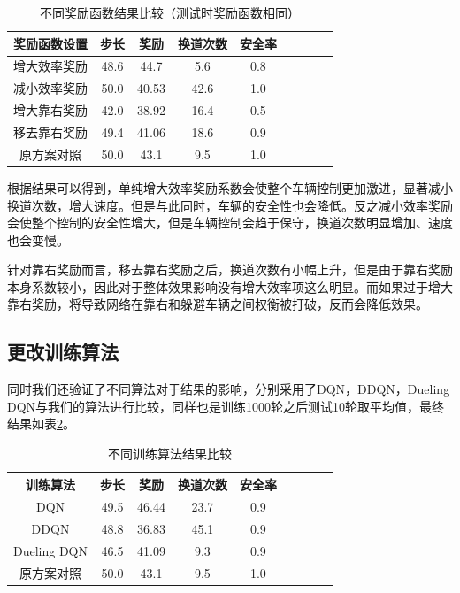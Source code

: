 \documentclass[letterpaper, 10 pt, conference]{ieeeconf}  %
\begin{document}
\begin{table}[!htbp] 
    \centering
    \caption{不同奖励函数结果比较（测试时奖励函数相同）}
    \begin{tabular}{ccccccccccc} %
    \toprule %
    \multicolumn{3}{c}{奖励函数设置}& 步长& 奖励&换道次数&安全率\\
    \hline %
    \multicolumn{3}{c}{增大效率奖励}& 48.6& 44.7& 5.6 &0.8& \\   %
    \multicolumn{3}{c}{减小效率奖励}& 50.0& 40.53& 42.6&1.0& \\
    \multicolumn{3}{c}{增大靠右奖励}& 42.0& 38.92& 16.4 & 0.5& \\
    \multicolumn{3}{c}{移去靠右奖励}& 49.4& 41.06& 18.6 &0.9& \\
    \multicolumn{3}{c}{原方案对照}& 50.0& 43.1& 9.5 &1.0& \\
    \bottomrule %
    \end{tabular}   
    \label{reward} 
\end{table}

根据结果可以得到，单纯增大效率奖励系数会使整个车辆控制更加激进，显著减小换道次数，增大速度。但是与此同时，车辆的安全性也会降低。反之减小效率奖励会使整个控制的安全性增大，但是车辆控制会趋于保守，换道次数明显增加、速度也会变慢。

针对靠右奖励而言，移去靠右奖励之后，换道次数有小幅上升，但是由于靠右奖励本身系数较小，因此对于整体效果影响没有增大效率项这么明显。而如果过于增大靠右奖励，将导致网络在靠右和躲避车辆之间权衡被打破，反而会降低效果。

\subsection[]{更改训练算法}
同时我们还验证了不同算法对于结果的影响，分别采用了DQN，DDQN，Dueling DQN与我们的算法进行比较，同样也是训练1000轮之后测试10轮取平均值，最终结果如表\ref{aldif}。

\begin{table}[!htbp] 
    \centering
    \caption{不同训练算法结果比较}
    \begin{tabular}{ccccccccccc} %
    \toprule %
    \multicolumn{3}{c}{训练算法}& 步长& 奖励&换道次数&安全率\\
    \hline %
    \multicolumn{3}{c}{DQN}& 49.5& 46.44& 23.7 &0.9& \\   %
    \multicolumn{3}{c}{DDQN}&48.8& 36.83& 45.1&0.9& \\
    \multicolumn{3}{c}{Dueling DQN}& 46.5& 41.09& 9.3 & 0.9& \\
    \multicolumn{3}{c}{原方案对照}& 50.0& 43.1& 9.5 &1.0& \\
    \bottomrule %
    \end{tabular}   
    \label{aldif} 
\end{table}
\end{document}
